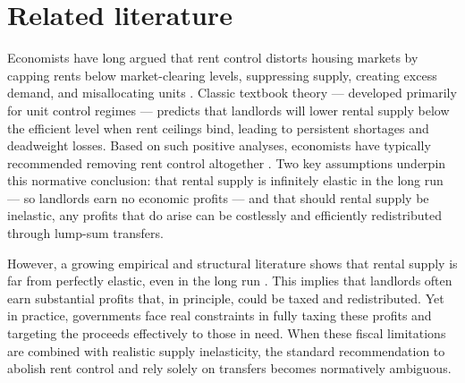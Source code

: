\documentclass[parskip=full]{article}
\begin{document}

\section{Related literature}\label{sec:related_lit}

Economists have long argued that rent control distorts housing markets by capping rents below market-clearing levels, suppressing supply, creating excess demand, and misallocating units \citep{suen-1989,gl-2003,diamond-2019}. Classic textbook theory — developed primarily for unit control regimes — predicts that landlords will lower rental supply below the efficient level when rent ceilings bind, leading to persistent shortages and deadweight losses. Based on such positive analyses, economists have typically recommended removing rent control altogether \citep{lindbeck1971,buchanan_1986,friedman_stigler_1946}. Two key assumptions underpin this normative conclusion: that rental supply is infinitely elastic in the long run — so landlords earn no economic profits — and that should rental supply be inelastic, any profits that do arise can be costlessly and efficiently redistributed through lump-sum transfers.

However, a growing empirical and structural literature shows that rental supply is far from perfectly elastic, even in the long run \citep{orr-1968,cy-1994,susin-2002,fack-2006,sy-2020,rs-2023}. This implies that landlords often earn substantial profits that, in principle, could be taxed and redistributed. Yet in practice, governments face real constraints in fully taxing these profits and targeting the proceeds effectively to those in need. When these fiscal limitations are combined with realistic supply inelasticity, the standard recommendation to abolish rent control and rely solely on transfers becomes normatively ambiguous.
\end{document}
